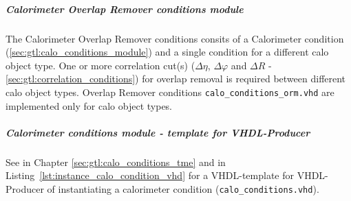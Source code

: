 \clearpage

\subparagraph{Calorimeter Overlap Remover conditions module}\label{sec:gtl:calo_conditions_orm_module}
The Calorimeter Overlap Remover conditions consits of a Calorimeter condition (\ref{sec:gtl:calo_conditions_module}) and a single condition for a different calo object type. One or more correlation cut(s) ($\Delta\eta$, $\Delta\varphi$ and $\Delta$$R$ - \ref{sec:gtl:correlation_conditions}) for overlap removal is required between different calo object types.
Overlap Remover conditions \texttt{calo\_conditions\_orm.vhd} are implemented only for calo object types.

\subparagraph{Calorimeter conditions module - template for VHDL-Producer}
See in Chapter \ref{sec:gtl:calo_conditions_tme} and in Listing~\ref{lst:instance_calo_condition_vhd} for a VHDL-template for VHDL-Producer of
instantiating a calorimeter condition (\texttt{calo\_conditions.vhd}).\\

